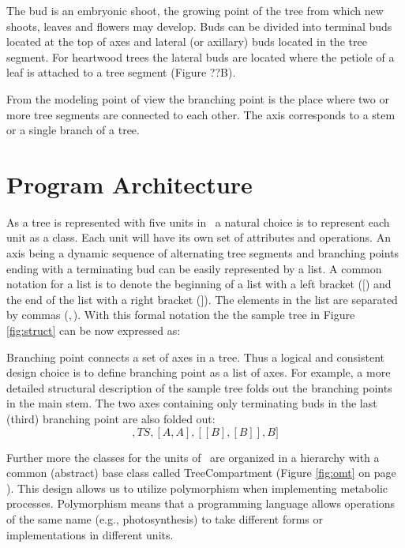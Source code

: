 The bud is  an embryonic shoot,  the  growing point  of the  tree from
which new shoots, leaves and flowers may develop.  Buds can be divided
into  terminal buds   located at the   top of  axes  and  lateral  (or
axillary)  buds located in the  tree segment.  For heartwood trees the
lateral buds are located where the petiole of  a leaf is attached to a
tree segment (Figure ??B).

From the modeling point of view the branching point is the place where
two or more  tree  segments are  connected  to each other.   The  axis
corresponds to a stem or a single branch of a tree.

\section{Program Architecture}

As a tree is represented with five units  in \lignum\ a natural choice
is to represent each unit as a class.  Each unit will have its own set
of attributes  and operations.  An axis  being  a dynamic  sequence of
alternating tree  segments   and  branching   points  ending  with   a
terminating  bud  can  be easily   represented by a   list.  A  common
notation for a list is  to denote the beginning  of a list with a left
bracket ($[$) and the end of the list with  a right bracket ($]$). The
elements in the list are separated by  commas ($,$).  With this formal
notation  the the  sample tree  in Figure \ref{fig:struct}  can be now
expressed as:
\begin{displaymath}
[TS,BP,TS,BP,TS,BP,B]
\end{displaymath}

Branching point connects a set of axes in a tree.   Thus a logical and
consistent design  choice is  to define branching  point  as a list of
axes.  For example, a   more detailed  structural description  of  the
sample tree  folds out the branching points  in the main stem. The two
axes containing only terminating   buds in the last (third)  branching
point are also folded out:
\begin{displaymath}
[TS,[A,A],TS,[A,A],[[B],[B]],B]
\end{displaymath}
 
Further more the classes for the units of \lignum\  are organized in a
hierarchy with a common (abstract)  base class called  TreeCompartment
(Figure \ref{fig:omt} on page  \pageref{fig:omt}).  This design allows
us to  utilize  polymorphism  when  implementing metabolic  processes.
Polymorphism means that  a  programming language allows operations  of
the   same name (e.g.,  photosynthesis)   to  take different forms  or
implementations in different units.

